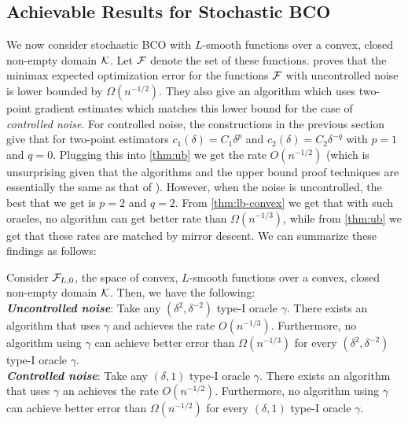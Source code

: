 

\subsection{Achievable Results for Stochastic BCO}
We now consider stochastic BCO with $L$-smooth functions over a convex, closed non-empty domain $\mathcal{K}$. 
Let $\mathcal{F}$ denote the set of these functions.
\citet{duchi2015optimal} proves that the minimax expected optimization error
for the functions $\mathcal{F}$ with uncontrolled noise is lower bounded by $\Omega(n^{-1/2})$. 
They also give an algorithm which uses two-point gradient estimates which matches this lower bound for the case of \emph{controlled noise}.
For controlled noise, the constructions in the previous section give that for two-point estimators $c_1(\delta) = C_1 \delta^p$ and $c_2(\delta) = C_2\delta^{-q}$ with $p=1$ and $q=0$. Plugging this into
\cref{thm:ub} we get the rate $O(n^{-1/2})$ (which is unsurprising
given that the algorithms and the upper bound proof techniques are essentially the same as that of \citet{duchi2015optimal}).
However, when the noise is uncontrolled, the best that we get is $p=2$ and $q=2$.
From \cref{thm:lb-convex} we get that with such oracles, no algorithm can get better rate than $\Omega(n^{-1/3})$, while from
\cref{thm:ub} we get that these rates are matched by mirror descent.
We can summarize these findings as follows:
\begin{theorem}\label{thm:aaab}
Consider $\mathcal{F}_{L,0}$, the space of convex, $L$-smooth functions over a convex, closed non-empty domain $\mathcal{K}$.
Then, we have the following:\\
\textit{\textbf{Uncontrolled noise}}:
Take any $(\delta^2,\delta^{-2})$ type-I oracle $\gamma$.
There exists an algorithm that uses $\gamma$
and achieves the rate $O(n^{-1/3})$.
Furthermore, no algorithm using $\gamma$
 can achieve better error than $\Omega(n^{-1/3})$ for every $(\delta^2,\delta^{-2})$ type-I oracle $\gamma$.\\
\textit{\textbf{Controlled noise}}:
Take any $(\delta,1)$ type-I oracle $\gamma$.
There exists an algorithm that uses $\gamma$ an
achieves the rate $O(n^{-1/2})$.
Furthermore, no algorithm using $\gamma$
 can achieve better error than $\Omega(n^{-1/2})$ for every $(\delta,1)$ type-I oracle $\gamma$.
\end{theorem}

